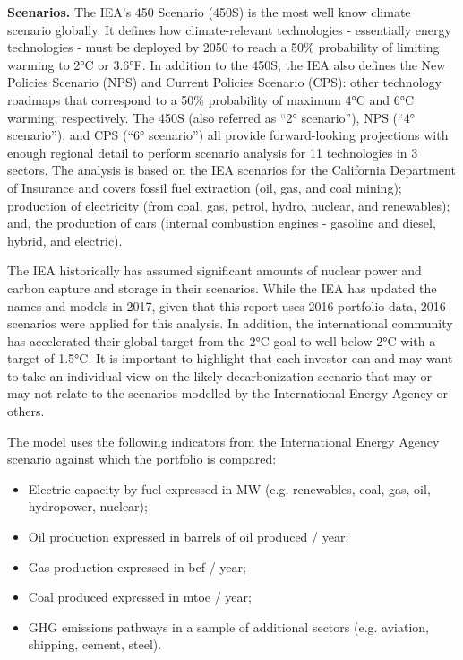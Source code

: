 \documentclass[10pt,table,a4]{article}\usepackage[]{graphicx}\usepackage[]{color}
\begin{document}
\begin{multicols}{2}
		\textbf{Scenarios.} The IEA’s 450 Scenario (450S) is the most well know climate scenario globally. It defines how climate-relevant technologies - 	essentially energy technologies - must be deployed by 2050 to reach a 50\% probability of limiting warming to 2°C or 3.6°F. In addition to the 450S, the IEA also defines the New Policies Scenario (NPS) and Current Policies Scenario (CPS): other technology roadmaps that correspond to a 50\% probability of maximum 4°C and 6°C warming, respectively. The 450S (also referred as “2° scenario”), NPS (“4° scenario”), and CPS (“6° scenario”) all provide forward-looking projections with enough regional detail to perform scenario analysis for 11 technologies in 3 sectors. The analysis is based on the IEA scenarios for the California Department of Insurance and covers fossil fuel extraction (oil, gas, and coal mining); production of electricity (from coal, gas, petrol, hydro, nuclear, and renewables); and, the production of cars (internal combustion engines - gasoline and diesel, hybrid, and electric).
		
		The IEA historically has assumed significant amounts of nuclear power and carbon capture and storage in their scenarios. While the IEA has updated the names and models in 2017, given that this report uses 2016 portfolio data, 2016 scenarios were applied for this analysis. In addition, the international community has accelerated their global target from the 2°C goal to well below 2°C with a target of 1.5°C. It is important to highlight that each investor can and may want to take an individual view on the likely decarbonization scenario that may or may not relate to the scenarios modelled by the International Energy Agency or others.
		
		The model uses the following indicators from the International Energy Agency scenario against which the portfolio is compared:
		\begin{itemize}
			\item{Electric capacity by fuel expressed in MW (e.g. renewables, coal, gas, oil, hydropower, nuclear);}
			\item{Oil production expressed in barrels of oil produced / year;}
			\item{Gas production expressed in bcf / year;}
			\item{Coal produced expressed in mtoe / year;}
			\item{GHG emissions pathways in a sample of additional sectors (e.g. aviation, shipping, cement, steel).}
		\end{itemize}
		

\end{multicols}
\end{document}
